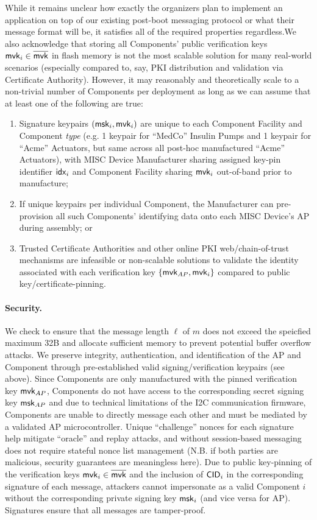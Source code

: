\iflong While it remains unclear how exactly the organizers plan to implement an application on top of our existing post-boot messaging protocol or what their message format will be, it satisfies all of the required properties regardless.\fi We also acknowledge that storing all Components' public verification keys $\mathsf{mvk}_i \in \overline{\mathsf{mvk}}$ in flash memory is not the most scalable solution for many real-world scenarios (especially compared to, say, PKI distribution and validation via Certificate Authority). However, it may reasonably and theoretically scale to a non-trivial number of Components per deployment as long as we can assume that at least one of the following are true:
\begin{enumerate}
    \item Signature keypairs $(\mathsf{msk}_i, \mathsf{mvk}_i)$ are unique to each Component Facility and Component \emph{type} (e.g. 1 keypair for ``MedCo'' Insulin Pumps and 1 keypair for ``Acme'' Actuators, but same across all post-hoc manufactured ``Acme'' Actuators), with MISC Device Manufacturer sharing assigned key-pin identifier $\mathsf{idx}_i$ and Component Facility sharing $\mathsf{mvk}_i$ out-of-band prior to manufacture;
    \item If unique keypairs per individual Component, the Manufacturer can pre-provision all such Components' identifying data onto each MISC Device's AP during assembly; or
    \item Trusted Certificate Authorities and other online PKI web/chain-of-trust mechanisms are infeasible or non-scalable solutions to validate the identity associated with each verification key $\left\{ \mathsf{mvk}_{AP}, \mathsf{mvk}_i \right\}$ compared to public key/certificate-pinning.
\end{enumerate}

\paragraph{Security.} We check to ensure that the message length $\ell$ of $m$ does not exceed the speicfied maximum 32B and allocate sufficient memory to prevent potential buffer overflow attacks. We preserve integrity, authentication, and identification of the AP and Component through pre-established valid signing/verification keypairs (see above). Since Components are only manufactured with the pinned verification key $\mathsf{mvk}_{AP}$, Components do not have access to the corresponding secret signing key $\mathsf{msk}_{AP}$ and due to technical limitations of the I2C communication firmware, Components are unable to directly message each other and must be mediated by a validated AP microcontroller. Unique ``challenge'' nonces for each signature help mitigate ``oracle'' and replay attacks, and without session-based messaging does not require stateful nonce list management (N.B. if both parties are malicious, security guarantees are meaningless here). Due to public key-pinning of the verification keys $\mathsf{mvk}_i \in \overline{\mathsf{mvk}}$ and the inclusion of $\mathsf{CID}_i$ in the corresponding signature of each message, attackers cannot impersonate as a valid Component $i$ without the corresponding private signing key $\mathsf{msk}_i$ (and vice versa for AP). Signatures ensure that all messages are tamper-proof.